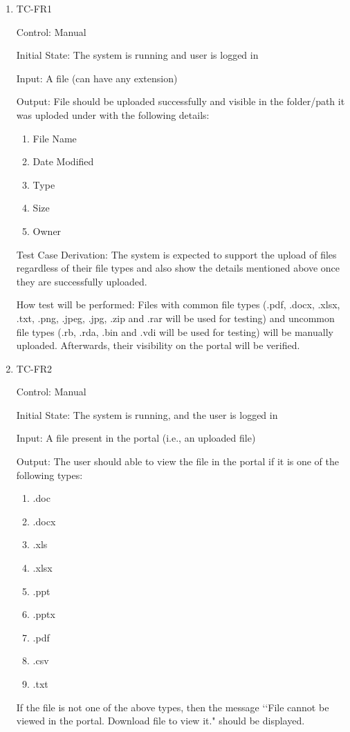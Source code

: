 \documentclass[12pt, titlepage]{article}
\begin{document}
\begin{enumerate}

  \item{TC-FR1\\}

    Control: Manual

    Initial State: The system is running and user is logged in

    Input: A file (can have any extension)

    Output: File should be uploaded successfully and visible in the folder/path
    it was uploded under with the following details:
    \begin{enumerate}
      \item File Name
      \item Date Modified
      \item Type
      \item Size
      \item Owner
    \end{enumerate}

    Test Case Derivation: The system is expected to support the upload of files
    regardless of their file types and also show the details mentioned above
    once they are successfully uploaded.

    How test will be performed: Files with common file types
    (.pdf, .docx, .xlsx, .txt, .png, .jpeg, .jpg, .zip and .rar
    will be used for testing) and uncommon file types (.rb, .rda, .bin and .vdi
    will be used for testing) will be manually uploaded. Afterwards, their
    visibility on the portal will be verified.

  \item{TC-FR2\\}

    Control: Manual

    Initial State: The system is running, and the user is logged in

    Input: A file present in the portal (i.e., an uploaded file)

    Output: The user should able to view the file in the portal if it is one
    of the following types:
    \begin{enumerate}
      \item .doc
      \item .docx
      \item .xls
      \item .xlsx
      \item .ppt
      \item .pptx
      \item .pdf
      \item .csv
      \item .txt
    \end{enumerate}
    If the file is not one of the above types, then the message \lq\lq File
    cannot be viewed in the portal. Download file to view it." should be
    displayed.


\end{enumerate}
\end{document}
